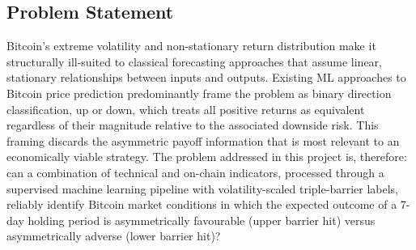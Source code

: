\subsection{Problem Statement}
Bitcoin's extreme volatility and non-stationary return distribution make it structurally ill-suited to classical forecasting approaches that assume linear, stationary relationships between inputs and outputs. Existing ML approaches to Bitcoin price prediction predominantly frame the problem as binary direction classification, up or down, which treats all positive returns as equivalent regardless of their magnitude relative to the associated downside risk. This framing discards the asymmetric payoff information that is most relevant to an economically viable strategy. The problem addressed in this project is, therefore: can a combination of technical and on-chain indicators, processed through a supervised machine learning pipeline with volatility-scaled triple-barrier labels, reliably identify Bitcoin market conditions in which the expected outcome of a 7-day holding period is asymmetrically favourable (upper barrier hit) versus asymmetrically adverse (lower barrier hit)?

